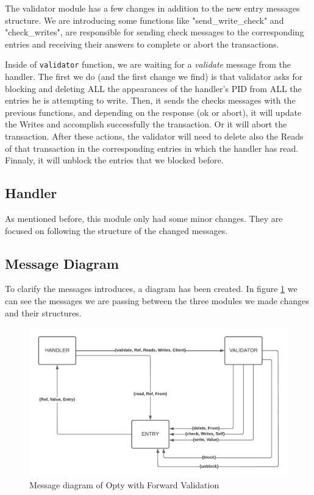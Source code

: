 \documentclass[a4paper, 10pt]{article}
\begin{document}
The validator module has a few changes in addition to the new entry messages structure. We are introducing some functions like "send\_write\_check" and "check\_writes", are responsible for sending check messages to the corresponding entries and receiving their answers to complete or abort the transactions.

Inside of \texttt{validator} function, we are waiting for a \textit{validate} message from the handler. The first we do (and the first change we find) is that validator asks for blocking and deleting ALL the appearances of the handler's PID from ALL the entries he is attempting to write. Then, it sends the checks messages with the previous functions, and depending on the response (ok or abort), it will update the Writes and accomplish successfully the transaction. Or it will abort the transaction. After these actions, the validator will need to delete also the Reads of that transaction in the corresponding entries in which the handler has read. Finnaly, it will unblock the entries that we blocked before.


\subsection{Handler}

As mentioned before, this module only had some minor changes. They are focused on following the structure of the changed messages.

\clearpage

\subsection{Message Diagram}

To clarify the messages introduces, a diagram has been created. In figure \ref{fig:diagram} we can see the messages we are passing between the three modules we made changes and their structures.

\begin{figure}[H]
  \centering
  \includegraphics[width=0.95\linewidth]{images/messagesForward.pdf}
    \caption{Message diagram of Opty with Forward Validation}
    \label{fig:diagram}
\end{figure} 
\end{document}
